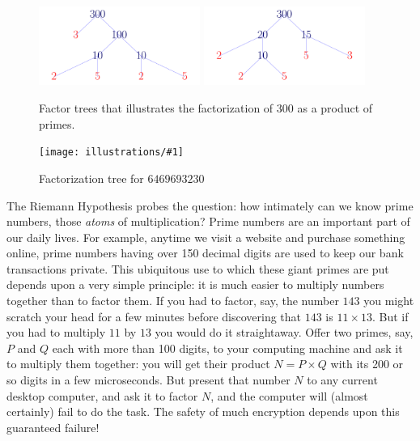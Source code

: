 \documentclass[11pt]{article}
\newcommand{\ill}[3]{ 
   \begin{figure}[H]
   \begin{center}
   \texttt{[image: illustrations/\#1]}
   \caption{#3}
   \end{center}
    \end{figure}
}
\theoremstyle{plain}
\theoremstyle{definition}
\numberwithin{equation}{section}
\numberwithin{figure}{section}
\numberwithin{table}{section}
\begin{document}
\begin{figure}[H]
\begin{center}
\includegraphics[width=0.47\textwidth]{illustrations/factor_tree_300_a}
\includegraphics[width=0.47\textwidth]{illustrations/factor_tree_300_b}
\caption{Factor trees that illustrates the factorization of 300 as a product of primes.\label{fig:factor300}}
\end{center}
\end{figure}

\ill{factor_tree_big}{1}{Factorization tree for $6469693230$\label{factor.tree.big}}
 
                        
The Riemann Hypothesis probes the question: how intimately can we know
prime numbers, those {\em atoms} of multiplication?  Prime numbers are
an important part of our daily lives.  For example, anytime we visit a
website and purchase something online, prime numbers having over 150
decimal digits are used to keep our bank transactions private.  This
ubiquitous use to which these giant primes are put depends upon a very
simple principle: it is much easier to multiply numbers together than
to factor them. If you had to factor, say, the number $143$ you might
scratch your head for a few minutes before discovering that $143$ is
$11\times 13$. But if you had to multiply $11$ by $13$ you would do it
straightaway.  Offer two primes, say, $P$ and $Q$ each with more than
100 digits, to your computing machine and ask it to multiply them
together: you will get their product $N = P\times Q$ with its 200 or
so digits in a few microseconds. But present that number $N$ to any
current desktop computer, and ask it to factor $N$, and the computer
will (almost certainly) fail to do the task. The safety of much
encryption depends upon this guaranteed failure!
\end{document}
